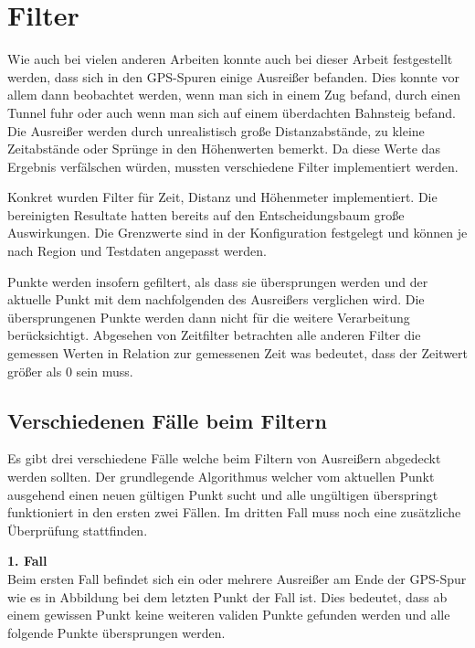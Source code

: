 \chapter{Filter}
Wie auch bei vielen anderen Arbeiten konnte auch bei dieser Arbeit festgestellt werden, dass sich in den GPS-Spuren einige Ausreißer befanden. Dies konnte vor allem dann beobachtet werden, wenn man sich in einem Zug befand, durch einen Tunnel fuhr oder auch wenn man sich auf einem überdachten Bahnsteig befand. Die Ausreißer werden durch unrealistisch große Distanzabstände, zu kleine Zeitabstände oder Sprünge in den Höhenwerten bemerkt. Da diese Werte das Ergebnis verfälschen würden, mussten verschiedene Filter implementiert werden. 

Konkret wurden Filter für Zeit, Distanz und Höhenmeter implementiert. Die bereinigten Resultate hatten bereits auf den Entscheidungsbaum große Auswirkungen. Die Grenzwerte sind in der Konfiguration festgelegt und können je nach Region und Testdaten angepasst werden.

Punkte werden insofern gefiltert, als dass sie übersprungen werden und der aktuelle Punkt mit dem nachfolgenden des Ausreißers verglichen wird. Die übersprungenen Punkte werden dann nicht für die weitere Verarbeitung berücksichtigt. Abgesehen von Zeitfilter betrachten alle anderen Filter die gemessen Werten in Relation zur gemessenen Zeit was bedeutet, dass der Zeitwert größer als 0 sein muss.
\clearpage

\section{Verschiedenen Fälle beim Filtern}
Es gibt drei verschiedene Fälle welche beim Filtern von Ausreißern abgedeckt werden sollten. Der grundlegende Algorithmus welcher vom aktuellen Punkt ausgehend einen neuen gültigen Punkt sucht und alle ungültigen überspringt funktioniert in den ersten zwei Fällen. Im dritten Fall muss noch eine zusätzliche Überprüfung stattfinden.

\textbf{1. Fall}\\
Beim ersten Fall befindet sich ein oder mehrere Ausreißer am Ende der GPS-Spur wie es in Abbildung  bei dem letzten Punkt der Fall ist. Dies bedeutet, dass ab einem gewissen Punkt keine weiteren validen Punkte gefunden werden und alle folgende Punkte übersprungen werden.


